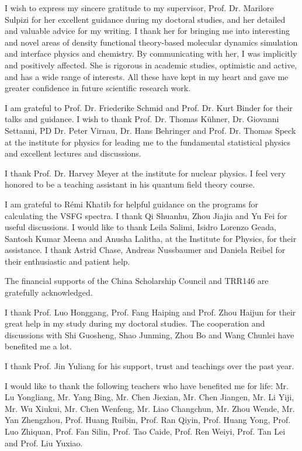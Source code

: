 \documentclass[
11pt, %
ngerman,
english, %
singlespacing, %
headsepline, %
]{MastersDoctoralThesis} %
\begin{document}
\begin{acknowledgements}
\addchaptertocentry{\acknowledgementname} %
I wish to express my sincere gratitude to my supervisor,
Prof. Dr. Marilore Sulpizi for her excellent guidance during my doctoral studies, and her detailed and valuable advice for my writing.
I thank her for bringing me into interesting and novel areas of density functional theory-based molecular dynamics simulation 
and interface physics and chemistry. By communicating with her, I was implicitly and positively affected. 
She is rigorous in academic studies, optimistic and active, and has a wide range of interests. 
All these have kept in my heart and gave me greater confidence in future scientific research work.

%
I am grateful to Prof. Dr. Friederike Schmid  and Prof. Dr. Kurt Binder for their talks and guidance.
I wish to thank Prof. Dr. Thomas Kühner, Dr. Giovanni Settanni, PD Dr. Peter
Virnau, Dr. Hans Behringer and Prof. Dr. Thomas Speck at the institute for
physics for leading me to the fundamental statistical physics and excellent lectures and discussions. 

%
I thank Prof. Dr. Harvey Meyer at the institute for nuclear physics. 
I feel very honored to be a teaching assistant in his quantum field theory course. 
%

%
I am grateful to R\'emi Khatib for helpful guidance on the programs for calculating the VSFG spectra. I thank Qi Shuanhu, Zhou Jiajia and Yu Fei for useful discussions. 
I would like to thank Leila Salimi, Isidro Lorenzo Geada, Santosh Kumar Meena and Anusha Lalitha, 
at the Institute for Physics, for their assistance.
%
I thank Astrid Chase, Andreas Nussbaumer and Daniela Reibel for their enthusiastic and patient help.

%
The financial supports of the China Scholarship Council and TRR146 are gratefully acknowledged.

%
I thank Prof. Luo Honggang, Prof. Fang Haiping and Prof. Zhou Haijun for their great help in my study during my doctoral studies. 
The cooperation and discussions with Shi Guosheng, Shao Junming, Zhou Bo and Wang Chunlei have benefited me a lot. 

%
I thank Prof. Jin Yuliang for his support, trust and teachings over the past year.

%
I would like to thank the following teachers who have benefited me for life:
Mr. Lu Yongliang, 
Mr. Yang Bing, Mr. Chen Jiexian, Mr. Chen Jiangen, Mr. Li Yiji,
Mr. Wu Xiukui, Mr. Chen Wenfeng, Mr. Liao Changchun, Mr. Zhou Wende,
Mr. Yan Zhengzhou, Prof. Huang Ruibin, Prof. Ran Qiyin, Prof. Huang Yong, Prof. Luo Zhiquan, Prof. Fan Silin, Prof. Tao Caide, Prof. Ren Weiyi, 
Prof. Tan Lei and Prof. Liu Yuxiao.


\end{acknowledgements}
\end{document}
